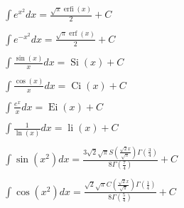 \documentclass[12pt]{article}
\begin{document}
\begin{align}
     & \int e^{x^2} dx = \frac{\sqrt{\pi} \operatorname{erfi}{\left(x \right)}}{2} + C                                                                                                                                                 \\ \nonumber \\
     & \int e^{-x^2} dx = \frac{\sqrt{\pi} \operatorname{erf}{\left(x \right)}}{2} + C                                                                                                                                                 \\ \nonumber \\
     & \int \frac{\sin(x)}{x} dx = \operatorname{Si}{\left(x \right)} + C                                                                                                                                                              \\ \nonumber \\
     & \int \frac{\cos(x)}{x} dx = \operatorname{Ci}{\left(x \right)} + C                                                                                                                                                              \\ \nonumber \\
     & \int \frac{e^x}{x} dx = \operatorname{Ei}{\left(x \right)} + C                                                                                                                                                                  \\ \nonumber \\
     & \int \frac{1}{\ln(x)} dx = \operatorname{li}{\left(x \right)} + C                                                                                                                                                               \\ \nonumber \\
     & \int \sin(x^2) dx = \frac{3 \sqrt{2} \sqrt{\pi} S\left(\frac{\sqrt{2} x}{\sqrt{\pi}}\right) \Gamma\left(\frac{3}{4}\right)}{8 \Gamma\left(\frac{7}{4}\right)} + C                                                               \\ \nonumber \\
     & \int \cos(x^2) dx = \frac{\sqrt{2} \sqrt{\pi} C\left(\frac{\sqrt{2} x}{\sqrt{\pi}}\right) \Gamma\left(\frac{1}{4}\right)}{8 \Gamma\left(\frac{5}{4}\right)} + C                                                                 \\ \nonumber \\

\end{align}
\end{document}
